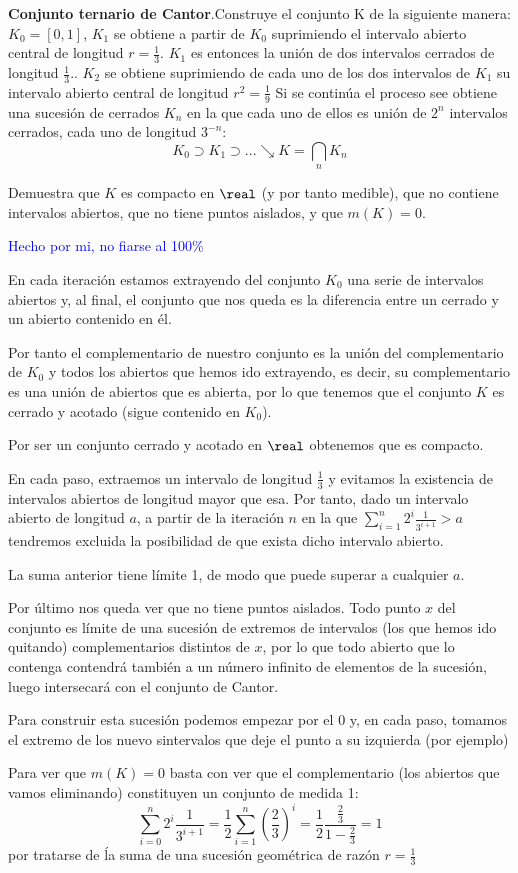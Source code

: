 \begin{problem}[15]
\textbf{Conjunto ternario de Cantor}.Construye el conjunto K de la siguiente manera: $K_0=[0,1]$, $K_1$ se obtiene a partir de $K_0$ suprimiendo el intervalo abierto central de longitud $r=\frac{1}{3}$. $K_1$ es entonces la unión de dos intervalos cerrados de longitud $\frac{1}{3}$.. $K_2$ se obtiene suprimiendo de cada uno de los dos intervalos de $K_1$ su intervalo abierto central de longitud $r^2=\frac{1}{9}$ Si se continúa el proceso see obtiene una sucesión de cerrados $K_n$
en la que cada uno de ellos es unión de $2^n$ intervalos cerrados, cada uno de longitud $3^{-n}$:
\[K_0 \supset K_1 \supset ... \searrow K=\bigcap_nK_n\]

Demuestra que $K$ es compacto en $\real$ (y por tanto medible), que no contiene intervalos abiertos, que no tiene puntos aislados, y que $m(K)=0$.

\solution

\textcolor{blue}{Hecho por mi, no fiarse al 100\%}

En cada iteración estamos extrayendo del conjunto $K_0$ una serie de intervalos abiertos y, al final, el conjunto que nos queda es la diferencia entre un cerrado y un abierto contenido en él.

Por tanto el complementario de nuestro conjunto es la unión del complementario de $K_0$ y todos los abiertos que hemos ido extrayendo, es decir, su complementario es una unión de abiertos que es abierta, por lo que tenemos que el conjunto $K$ es cerrado y acotado (sigue contenido en $K_0$).

Por ser un conjunto cerrado y acotado en $\real$ obtenemos que es compacto.

En cada paso, extraemos un intervalo de longitud $\frac{1}{3}$ y evitamos la existencia de intervalos abiertos de longitud mayor que esa. Por tanto, dado un intervalo abierto de longitud $a$, a partir de la iteración $n$ en la que $\sum_{i=1}^{n}2^i\frac{1}{3^{i+1}}>a$ tendremos excluida la posibilidad de que exista dicho intervalo abierto.

La suma anterior tiene límite 1, de modo que puede superar a cualquier $a$.

Por último nos queda ver que no tiene puntos aislados. Todo punto $x$ del conjunto es límite de una sucesión de extremos de intervalos (los que hemos ido quitando) complementarios distintos de $x$, por lo que todo abierto que lo contenga contendrá también a un número infinito de elementos de la sucesión, luego intersecará con el conjunto de Cantor.

Para construir esta sucesión podemos empezar por el 0 y, en cada paso, tomamos el extremo de los nuevo sintervalos que deje el punto a su izquierda (por ejemplo)

Para ver que $m(K)=0$ basta con ver que el complementario (los abiertos que vamos eliminando) constituyen un conjunto de medida 1:
\[\sum_{i=0}^{n}2^i\frac{1}{3^{i+1}} = \frac{1}{2}\sum_{i=1}^{n}\left(\frac{2}{3}\right)^i = \frac{1}{2}\frac{\frac{2}{3}}{1-\frac{2}{3}} = 1\]
por tratarse de ĺa suma de una sucesión geométrica de razón $r=\frac{1}{3}$
\end{problem}

